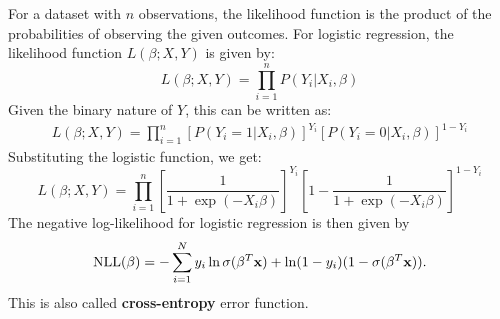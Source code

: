For a dataset with \( n \) observations, the likelihood function is the product of the probabilities of observing the given outcomes. For logistic regression, the likelihood function \( L(\beta; X, Y) \) is given by:
\[
L(\beta; X, Y) = \prod_{i=1}^{n} P(Y_i | X_i, \beta)
\]
Given the binary nature of \( Y \), this can be written as:
\begin{align*}
	L(\beta; X, Y) = \prod_{i=1}^{n} [P(Y_i = 1 | X_i, \beta)]^{Y_i} [P(Y_i = 0 | X_i, \beta)]^{1 - Y_i}
\end{align*}
Substituting the logistic function, we get:
\[
L(\beta; X, Y) = \prod_{i=1}^{n} \left[\frac{1}{1 + \exp(-X_i \beta)}\right]^{Y_i} \left[1 - \frac{1}{1 + \exp(-X_i \beta)}\right]^{1 - Y_i}
\]
The negative log-likelihood for logistic regression is then given by
\begin{align*}
	\textrm{NLL}(\beta) = -\sum_{i=1}^N y_i\ln\sigma(\beta^T{\mathbf{x}})+\ln(1-y_i)(1-\sigma(\beta^T{\mathbf{x}})).
\end{align*}
This is also called \textbf{cross-entropy} error function. 

